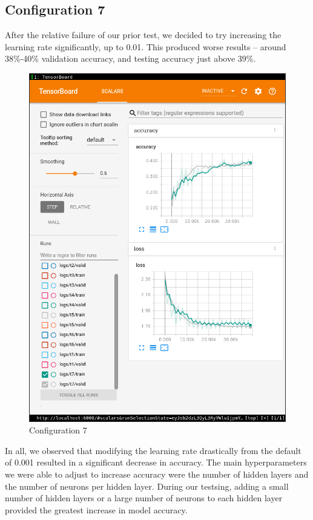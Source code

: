 \documentclass[11pt]{article}
\begin{document}
\subsection*{Configuration 7}
After the relative failure of our prior test, we decided to try increasing the learning rate significantly, up to 0.01.
This produced worse results -- around 38\%-40\% validation accuracy, and testing accuracy just above 39\%.
\begin{figure}[H]
	\centering
	\includegraphics[width=0.6 \textwidth]{figure/t7.png}
	\caption{Configuration 7}
	\label{fig:t7}
\end{figure}

In all, we observed that modifying the learning rate drastically from the default of 0.001 resulted in a significant decrease in accuracy.
The main hyperparameters we were able to adjust to increase accuracy were the number of hidden layers and the number of neurons per hidden layer.
During our testsing, adding a small number of hidden layers or a large number of neurons to each hidden layer provided the greatest increase in model accuracy.
\end{document}

